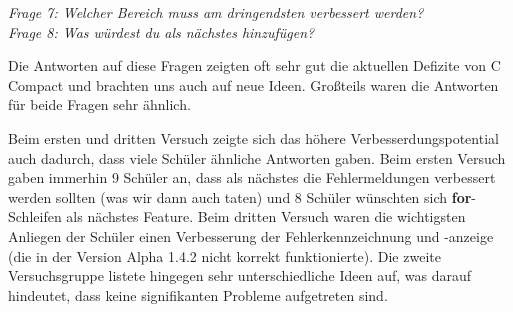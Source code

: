 \emph{Frage 7: Welcher Bereich muss am dringendsten verbessert werden?\\
Frage 8: Was würdest du als nächstes hinzufügen?}

Die Antworten auf diese Fragen zeigten oft sehr gut die aktuellen Defizite von C Compact und brachten uns auch auf neue Ideen. Großteils waren die Antworten für beide Fragen sehr ähnlich.

Beim ersten und dritten Versuch zeigte sich das höhere Verbesserdungspotential auch dadurch, dass viele Schüler ähnliche Antworten gaben. Beim ersten Versuch 
gaben immerhin 9 Schüler an, dass als nächstes die Fehlermeldungen verbessert werden sollten (was wir dann auch taten) und 8 Schüler wünschten sich \textbf{for}-Schleifen als nächstes Feature. Beim dritten Versuch waren die wichtigsten Anliegen der Schüler einen Verbesserung der Fehlerkennzeichnung und -anzeige (die in der Version Alpha 1.4.2 nicht korrekt funktionierte). Die zweite Versuchsgruppe listete hingegen sehr unterschiedliche Ideen auf, was darauf hindeutet, dass keine signifikanten Probleme aufgetreten sind.
